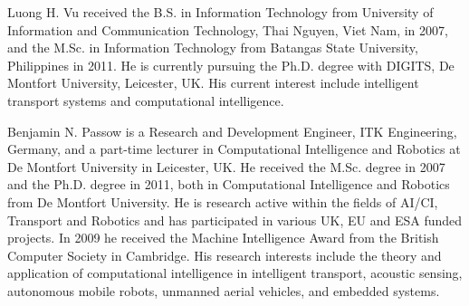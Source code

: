 \documentclass[journal]{IEEEtran}
\begin{document}

%
%
%
%
%



% 

\begin{IEEEbiography}{Luong H. Vu}
received the B.S. in Information Technology from University of Information and Communication Technology, Thai Nguyen, Viet Nam, in 2007, and the M.Sc. in Information Technology from Batangas State University, Philippines in 2011. He is currently pursuing the Ph.D. degree with DIGITS, De Montfort University, Leicester, UK. His current interest include intelligent transport systems and computational intelligence.
\end{IEEEbiography}

\begin{IEEEbiographynophoto}{Benjamin N. Passow}
is a Research and Development Engineer, ITK Engineering, Germany, and a part-time lecturer in Computational Intelligence and Robotics at De Montfort University in Leicester, UK. He received the M.Sc. degree in 2007 and the Ph.D. degree in 2011, both in Computational Intelligence and Robotics from De Montfort University. He is research active within the fields of AI/CI, Transport and Robotics and has participated in various UK, EU and ESA funded projects. In 2009 he received the Machine Intelligence Award from the British Computer Society in Cambridge. His research interests include the theory and application of computational intelligence in intelligent transport, acoustic sensing, autonomous mobile robots, unmanned aerial vehicles, and embedded systems.
\end{IEEEbiographynophoto}
\end{document}
